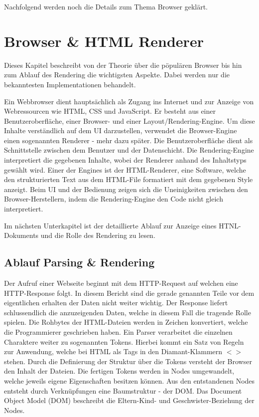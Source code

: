 Nachfolgend werden noch die Details zum Thema Browser geklärt.


\section{Browser \& HTML Renderer}

Dieses Kapitel beschreibt von der Theorie über die pöpulären Browser bis hin zum Ablauf des Rendering die wichtigsten Aspekte.
Dabei werden nur die bekanntesten Implementationen behandelt.

Ein Webbrowser dient hauptsächlich als Zugang ins Internet und zur Anzeige von Webressourcen wie HTML, CSS und JavaScript.
Er besteht aus einer Benutzeroberfläche, einer Browser- und einer Layout/Rendering-Engine.
Um diese Inhalte verständlich auf dem UI darzustellen, verwendet die Browser-Engine einen sogenannten Renderer - mehr dazu später.
Die Benutzeroberfläche dient als Schnittstelle zwischen dem Benutzer und der Datenschicht. 
Die Rendering-Engine interpretiert die gegebenen Inhalte, wobei der Renderer anhand des Inhaltstyps gewählt wird. 
Einer der Engines ist der HTML-Renderer, eine Software, welche den strukturierten Text aus dem HTML-File formatiert mit dem gegebenen Style anzeigt.
Beim UI und der Bedienung zeigen sich die Uneinigkeiten zwischen den Browser-Herstellern, indem die Rendering-Engine den Code nicht gleich interpretiert.

Im nächsten Unterkapitel ist der detaillierte Ablauf zur Anzeige eines HTNL-Dokuments und die Rolle des Rendering zu lesen.


\subsection{Ablauf Parsing \& Rendering}

Der Aufruf einer Webseite beginnt mit dem HTTP-Request auf welchen eine HTTP-Response folgt.
In diesem Bericht sind die gerade genannten Teile vor dem eigentlichen erhalten der Daten nicht weiter wichtig.
Der Response liefert schlussendlich die anzuzeigenden Daten, welche in diesem Fall die tragende Rolle spielen.
Die Rohbytes der HTML-Dateien werden in Zeichen konvertiert, welche die Programmierer geschrieben haben.
Ein Parser verarbeitet die einzelnen Charaktere weiter zu sogenannten Tokens.
Hierbei kommt ein Satz von Regeln zur Anwendung, welche bei HTML als Tags in den Diamant-Klammern $<>$ stehen.
Durch die Definierung der Struktur über die Tokens versteht der Browser den Inhalt der Dateien.
Die fertigen Tokens werden in Nodes umgewandelt, welche jeweils eigene Eigenschaften besitzen können.
Aus den entstandenen Nodes entsteht durch Verknüpfungen eine Baumstruktur - der DOM.
Das Document Object Model (DOM) beschreibt die Eltern-Kind- und Geschwister-Beziehung der Nodes.

